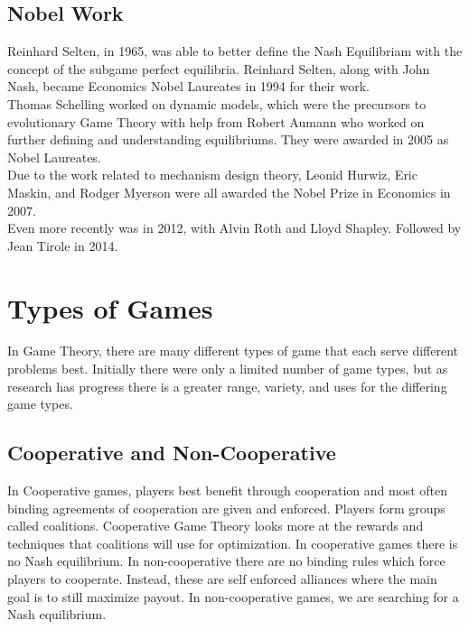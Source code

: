 \documentclass[12pt]{article}
\begin{document}
 	 \subsection{Nobel Work}
 	 Reinhard Selten, in 1965, was able to better define the Nash Equilibriam with the concept of the subgame perfect equilibria. Reinhard Selten, along with John Nash, became Economics Nobel Laureates in 1994 for their work.\\
 	 Thomas Schelling worked on dynamic models, which were the precursors to evolutionary Game Theory with help from Robert Aumann who worked on further defining and understanding equilibriums. They were awarded in 2005 as Nobel Laureates.\\
 	 Due to the work related to mechanism design theory, Leonid Hurwiz, Eric Maskin, and Rodger Myerson were all awarded the Nobel Prize in Economics in 2007.\\
 	 Even more recently was in 2012, with Alvin Roth and Lloyd Shapley. Followed by Jean Tirole in 2014.
 	\section{Types of Games}
 	In Game Theory, there are many different types of game that each serve different problems best. Initially there were only a limited number of game types, but as research has progress there is a greater range, variety, and uses for the differing game types.
 	\subsection{Cooperative and Non-Cooperative}
 		In Cooperative games, players best benefit through cooperation and most often binding agreements of cooperation are given and enforced. Players form groups called coalitions. Cooperative Game Theory looks more at the rewards and techniques that coalitions will use for optimization. In cooperative games there is no Nash equilibrium. In non-cooperative there are no binding rules which force players to cooperate. Instead, these are self enforced alliances where the main goal is to still maximize payout. In non-cooperative games, we are searching for a Nash equilibrium. 
\end{document}
